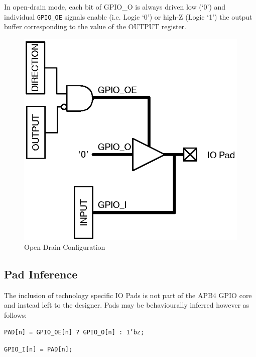 In open-drain mode, each bit of GPIO\_O is always driven low (`0') and individual \texttt{GPIO\_OE} signals enable (i.e. Logic `0') or high-Z (Logic `1') the output buffer corresponding to the value of the OUTPUT register.

\begin{figure}[tbh]
	\centering
	\includegraphics{assets/img/apb4-gpio-od}
	\caption{Open Drain Configuration}
	\label{fig:apb4-gpio-od}
\end{figure}

\subsection{Pad Inference}\label{pad-inference}

The inclusion of technology specific IO Pads is not part of the APB4
GPIO core and instead left to the designer. Pads may be behaviourally
inferred however as follows:

\texttt{PAD[n] = GPIO\_OE[n] ? GPIO\_O[n] : 1'bz;}

\texttt{GPIO\_I[n] = PAD[n];}
